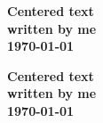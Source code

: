\documentclass{article}
\begin{document}
{\centering
\huge\bfseries Centered text \\
\Large\normalfont written by me \\
\normalsize\today

}


{\centering
\huge\bfseries Centered text \\
\Large\normalfont written by me \\
\normalsize\today  %
}
\end{document}
